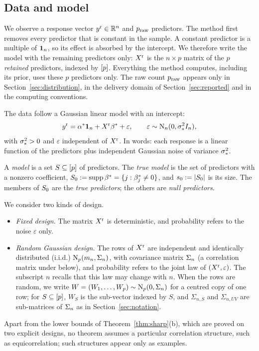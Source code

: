 \subsection{Data and model}\label{sec:model}

We observe a response vector $y^{\mathrm r}\in\mathbb{R}^n$ and $p_{\mathrm{raw}}$ predictors. The method first removes every predictor that is
constant in the sample. A constant predictor is a multiple of $\mathbf{1}_n$, so its effect is absorbed by the intercept. We
therefore write the model with the remaining predictors only: $X^{\mathrm r}$ is the $n\times p$ matrix of the $p$ \emph{retained}
predictors, indexed by $[p]$. Everything the method computes, including its prior, uses these $p$ predictors only.
The raw count $p_{\mathrm{raw}}$ appears only in Section~\ref{sec:distribution}, in the delivery domain of
Section~\ref{sec:reported} and in the computing conventions.

The data follow a Gaussian linear model with an intercept:
\begin{equation}\label{eq:model}
  y^{\mathrm r}=\alpha^*\mathbf{1}_n+X^{\mathrm r}\beta^*+\varepsilon,\qquad \varepsilon\sim\mathrm{N}_n(0,\sigma_*^2I_n),
\end{equation}
with $\sigma_*^2>0$ and $\varepsilon$ independent of $X^{\mathrm r}$. In words: each response is a linear function of the predictors
plus independent Gaussian noise of variance $\sigma_*^2$.

A \emph{model} is a set $S\subseteq[p]$ of predictors. The \emph{true model} is the set of predictors with a nonzero
coefficient, $S_0:=\operatorname{supp}\beta^*=\{j:\beta^*_j\neq0\}$, and $s_0:=\lvert S_0\rvert$ is its size. The members of $S_0$ are the
\emph{true predictors}; the others are \emph{null predictors}.

We consider two kinds of design.
\begin{itemize}[leftmargin=1.5em]
  \item \emph{Fixed design.} The matrix $X^{\mathrm r}$ is deterministic, and probability refers to the noise $\varepsilon$ only.
  \item \emph{Random Gaussian design.} The rows of $X^{\mathrm r}$ are independent and identically distributed (i.i.d.)
    $\mathrm{N}_p(m_n,\Sigma_n)$, with covariance matrix $\Sigma_n$ (a correlation matrix under  below), and probability
    refers to the joint law of $(X^{\mathrm r},\varepsilon)$. The subscript $n$ recalls that this law may change with $n$. When the
    rows are random, we write $W=(W_1,\dots,W_p)\sim\mathrm{N}_p(0,\Sigma_n)$ for a centred copy of one row; for
    $S\subseteq[p]$, $W_S$ is the sub-vector indexed by $S$, and $\Sigma_{n,S}$ and $\Sigma_{n,UV}$ are sub-matrices
    of $\Sigma_n$ as in Section~\ref{sec:notation}.
\end{itemize}
Apart from the lower bounds of Theorem~\ref{thm:sharp}(b), which are proved on two explicit designs, no theorem assumes
a particular correlation structure, such as equicorrelation; such structures appear only as
examples.

